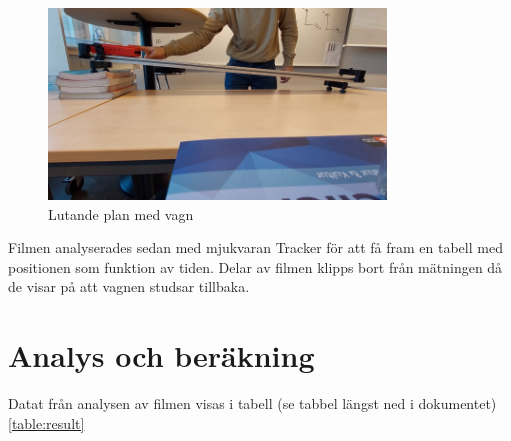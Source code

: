 \documentclass[11p, titlepage, oneside, a4paper]{article}
\begin{document}
        \begin{figure}[!h]
            \includegraphics[width=0.8\textwidth]{images/img.png}
            \caption{Lutande plan med vagn}
            \label{fig:lutandeplan}
        \end{figure}
        
        Filmen analyserades sedan med mjukvaran Tracker för att få fram en tabell med positionen som funktion av tiden. Delar av filmen klipps bort från mätningen då de visar på att vagnen studsar tillbaka.


    \newpage
	\section{Analys och beräkning}
        Datat från analysen av filmen visas i tabell (se tabbel längst ned i dokumentet)\ref{table:result}
\end{document}
